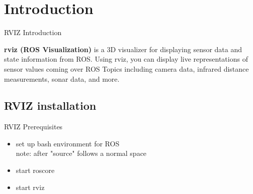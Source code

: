 \documentclass{beamer}
\begin{document}
\section{Introduction}

\begin{frame}{RVIZ Introduction}	

	\begin{definition}
		\textbf{rviz (ROS Visualization)} is a 3D visualizer for displaying sensor data and state information from ROS. Using rviz, you can display live representations of sensor values coming over ROS Topics including camera data, infrared distance measurements, sonar data, and more. 
	
	\end{definition}
\end{frame}

\subsection{RVIZ installation}
\begin{frame}[fragile]{RVIZ Prerequisites}	

	\begin{itemize}
		\item set up bash environment for ROS \\

			
			note: after "source" follows a normal space	
		
		
		\item start roscore \\
			
			
			
		\item start rviz \\
			
		
	\end{itemize}

\end{frame}




\end{document}
